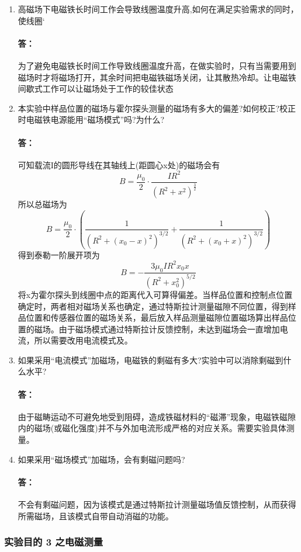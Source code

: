 \documentclass{ctexart}
\theoremstyle{ansstyle}
\begin{document}
\begin{enumerate}

    \item 高磁场下电磁铁长时间工作会导致线圈温度升高,如何在满足实验需求的同时，使线圈`
          \paragraph{答：}为了避免电磁铁长时间工作导致线圈温度升高，在做实验时，只有当需要用到磁场时才将磁场打开，其余时间把电磁铁磁场关闭，让其散热冷却。让电磁铁间歇式工作可以让磁场处于工作的较佳状态
    \item 本实验中样品位置的磁场与霍尔探头测量的磁场有多大的偏差?如何校正?校正时电磁铁电源能用“磁场模式”吗?为什么?
          \paragraph{答：}可知载流I的圆形导线在其轴线上(距圆心x处)的磁场会有
          $$B=\frac{\mu_{0}}{2}\cdot \frac{IR^{2}}{(R^{2}+x^{2})^{\frac{3}{2}}}$$
          所以总磁场为
          $$B=\frac{\mu_{0}}{2}\cdot (\frac{1}{(R^{2}+(x_{0}-x)^{2})^{3/2}}+\frac{1}{(R^{2}+(x_{0}+x)^{2})^{3/2}})$$
          得到泰勒一阶展开项为$$B=-\frac{3\mu_{0}IR^{2}x_{0}x}{(R^{2}+x_{0}^{2})^{5/2}}$$
          将x为霍尔探头到线圈中点的距离代入可算得偏差。当样品位置和控制点位置确定时，两者相对磁场关系也确定，通过特斯拉计测量磁隙不同位置，得到样品位置和传感器位置的磁场关系，最后放入样品测量磁隙位置磁场算出样品位置的磁场。由于磁场模式通过特斯拉计反馈控制，未达到磁场会一直增加电流，所以需要改用电流模式及。
    \item 如果采用“电流模式”加磁场，电磁铁的剩磁有多大?实验中可以消除剩磁到什么水平?
          \paragraph{答：}由于磁畴运动不可避免地受到阻碍，造成铁磁材料的“磁滞”现象，电磁铁磁隙内的磁场(或磁化强度)并不与外加电流形成严格的对应关系。需要实验具体测量。
    \item 如果采用“磁场模式”加磁场，会有剩磁问题吗?
          \paragraph{答：}不会有剩磁问题，因为该模式是通过特斯拉计测量磁场值反馈控制，从而获得所需磁场，且该模式自带自动消磁的功能。


\end{enumerate}
\subsubsection{实验目的 3 之电磁测量}
\end{document}

